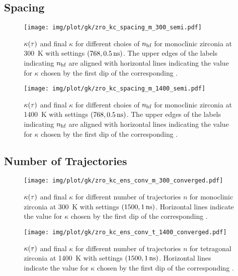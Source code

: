 \clearpage
\subsection{Spacing}

\begin{figure}
  \texttt{[image: img/plot/gk/zro\_kc\_spacing\_m\_300\_semi.pdf]}
  \caption{
  $\kappa(\tau)$ and final $\kappa$ for different choies of $n_{\text{hf}}$ 
  for monoclinic zirconia at \qty{300}{K}
  with  settings $(768, \qty{0.5}{ns})$.
  The upper edges of the labels indicating $n_{\text{hf}}$ are aligned with horizontal lines indicating the value for $\kappa$ chosen by the first dip of the corresponding \hfacf.
  }
  \label{fig:si-gkc_spacing_m_300_semi}
\end{figure}

\begin{figure}
  \texttt{[image: img/plot/gk/zro\_kc\_spacing\_m\_1400\_semi.pdf]}
  \caption{
  $\kappa(\tau)$ and final $\kappa$ for different choies of $n_{\text{hf}}$ 
  for monoclinic zirconia at \qty{1400}{K}
  with  settings $(768, \qty{0.5}{ns})$.
  The upper edges of the labels indicating $n_{\text{hf}}$ are aligned with horizontal lines indicating the value for $\kappa$ chosen by the first dip of the corresponding \hfacf.
  }
  \label{fig:si-gkc_spacing_m_1400_semi}
\end{figure}

\clearpage
\subsection{Number of Trajectories}

\begin{figure}
  \texttt{[image: img/plot/gk/zro\_kc\_ens\_conv\_m\_300\_converged.pdf]}
  \caption{
  $\kappa(\tau)$ and final $\kappa$ for different number of trajectories $n$
  for monoclinic zirconia at \qty{300}{K}
  with  settings $(1500, \qty{1}{ns})$.
  Horizontal lines indicate the value for $\kappa$ chosen by the first dip of the corresponding \hfacf.
  }
  \label{fig:si-gkc_ens_conv_m_300_converged}
\end{figure}

\begin{figure}
  \texttt{[image: img/plot/gk/zro\_kc\_ens\_conv\_t\_1400\_converged.pdf]}
  \caption{
  $\kappa(\tau)$ and final $\kappa$ for different number of trajectories $n$
  for tetragonal zirconia at \qty{1400}{K}
  with  settings $(1500, \qty{1}{ns})$.
  Horizontal lines indicate the value for $\kappa$ chosen by the first dip of the corresponding \hfacf.
  }
  \label{fig:si-gkc_ens_conv_t_1400_converged}
\end{figure}


